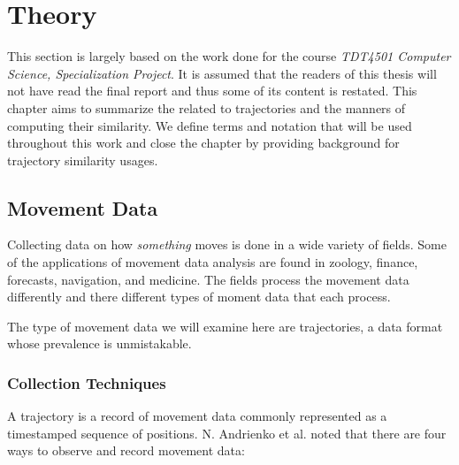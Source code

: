 \chapter{Theory}
\label{ch:2}

This section is largely based on the work done for the course \textit{TDT4501 Computer Science, Specialization Project}\cite{0-SimilarityMeasures}. 
It is assumed that the readers of this thesis will not have read the final report and thus some of its content is restated. 
This chapter aims to summarize the related to trajectories and the manners of computing their similarity.
We define terms and notation that will be used throughout this work and close the chapter by providing background for trajectory similarity usages.  


\section{Movement Data}

Collecting data on how \textit{something} moves is done in a wide variety of fields. 
Some of the applications of movement data analysis are found in zoology, finance, forecasts, navigation, and medicine\cite{15-BasicConcepts,89-FinancialTimeseries, 90-InternationalGNSS,91-EnhancedRepresentation}.
The fields process the movement data differently and there different types of moment data that each process.

The type of movement data we will examine here are trajectories, a data format whose prevalence is unmistakable.



\subsection{Collection Techniques}
A trajectory is a record of movement data commonly represented as a timestamped sequence of positions. N. Andrienko et al. noted that there are four ways to observe and record movement data\cite{15-BasicConcepts}:

